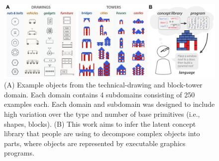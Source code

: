 \documentclass[10pt,letterpaper]{article}
\begin{document}



\begin{figure}[ht!]
  \begin{center}
  \includegraphics[width=0.99\linewidth]{figures/lax_task.pdf}
  \caption{(A) Example objects from the technical-drawing and block-tower domain. Each domain contains 4 subdomains consisting of 250 examples each. Each domain and subdomain was designed to include high variation over the type and number of base primitives (i.e., shapes, blocks). (B) This work aims to infer the latent concept library that people are using to decompose complex objects into parts, where objects are represented by executable graphics programs.}
  \label{fig:task}
  \end{center}
 \end{figure}
\end{document}
